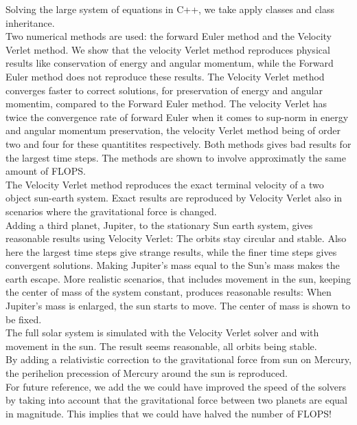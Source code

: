 \documentclass{article}
\begin{document}
Solving the large system of equations in C++, we take apply classes and class inheritance.\\

Two numerical methods are used: the forward Euler method and the Velocity Verlet method. We show that the velocity Verlet method reproduces physical results like conservation of energy and angular momentum, while the Forward Euler method does not reproduce these results. The Velocity Verlet method converges faster to correct solutions, for preservation of energy and angular momentim, compared to the Forward Euler method. The velocity Verlet has twice the convergence rate of forward Euler when it comes to sup-norm in energy and angular momentum preservation, the velocity Verlet method being of order two and four for these quantitites respectively. Both methods gives bad results for the largest time steps. The methods are shown to involve approximatly the same amount of FLOPS.\\

The Velocity Verlet method reproduces the exact terminal velocity of a two object sun-earth system. Exact results are reproduced by Velocity Verlet also in scenarios where the gravitational force is changed. \\

Adding a third planet, Jupiter, to the stationary Sun earth system, gives reasonable results using Velocity Verlet: The orbits stay circular and stable. Also here the largest time steps give strange results, while the finer time steps gives convergent solutions. Making Jupiter's mass equal to the Sun's mass makes the earth escape. More realistic scenarios, that includes movement in the sun, keeping the center of mass of the system constant, produces reasonable results: When Jupiter's mass is enlarged, the sun starts to move. The center of mass is shown to be fixed.\\

The full solar system is simulated with the Velocity Verlet solver and with movement in the sun. The result seems reasonable, all orbits being stable.\\

By adding a relativistic correction to the gravitational force from sun on Mercury, the perihelion precession of Mercury around the sun is reproduced.\\

For future reference, we add the we could have improved the speed of the solvers by taking into account that the gravitational force between two planets are equal in magnitude. This implies that we could have halved the number of FLOPS!
\end{document}

